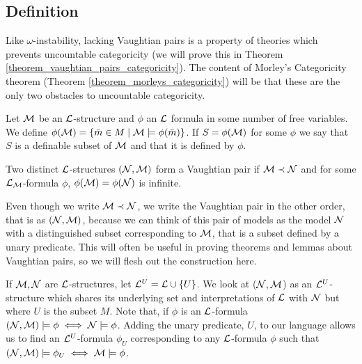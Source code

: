 \subsection{Definition}
Like \(\omega\)-instability, lacking Vaughtian pairs is a property of theories which prevents uncountable categoricity (we will prove this in Theorem \ref{theorem_vaughtian_pairs_categoricity}).
The content of Morley's Categoricity theorem (Theorem \ref{theorem_morleys_categoricity}) will be that these are the only two obstacles to uncountable categoricity. 

\begin{definition}\label{definition_definable_subset}
Let \(\mathcal{M}\) be an \(\mathcal{L}\)-structure and \(\phi\) an \(\mathcal{L}\) formula in some number of free variables.
We define \(\phi(\mathcal{M}) = \{\bar{m} \in M \mid \mathcal{M} \models \phi(\bar{m})\}\).
If \(S = \phi(\mathcal{M})\) for some \(\phi\) we say that \(S\) is a definable subset of \(\mathcal{M}\) and that it is defined by \(\phi\).
\end{definition}

\begin{definition}\label{definition_vaughtian_pairs}
Two distinct \(\mathcal{L}\)-structures \((\mathcal{N}, \mathcal{M})\) form a Vaughtian pair if \(\mathcal{M} \prec \mathcal{N}\) and for some \(\mathcal{L}_{\mathcal{M}}\)-formula \(\phi\), \(\phi(\mathcal{M}) = \phi(\mathcal{N})\) is infinite. 
\end{definition}

Even though we write \(\mathcal{M} \prec \mathcal{N}\), we write the Vaughtian pair in the other order, that is as \((\mathcal{N}, \mathcal{M})\), because we can think of this pair of models as the model \(\mathcal{N}\) with a distinguished subset corresponding to \(\mathcal{M}\), that is a subset defined by a unary predicate.
This will often be useful in proving theorems and lemmas about Vaughtian pairs, so we will flesh out the construction here. 

If \(\mathcal{M}, \mathcal{N}\) are \(\mathcal{L}\)-structures, let  \(\mathcal{L}^U = \mathcal{L} \cup \{U\}\). 
We look at (\(\mathcal{N}, \mathcal{M}\)) as an \(\mathcal{L}^U\)-structure which shares its underlying set and interpretations of \(\mathcal{L}\) with \(\mathcal{N}\) but where \(U\) is the subset \(M\). 
Note that, if \(\phi\) is an \(\mathcal{L}\)-formula \((\mathcal{N}, \mathcal{M}) \models \phi \iff \mathcal{N} \models \phi\).
Adding the unary predicate, \(U\), to our language allows us to find an \(\mathcal{L}^U\)-formula \(\phi_U\) corresponding to any \(\mathcal{L}\)-formula \(\phi\) such that \((\mathcal{N}, \mathcal{M}) \models \phi_U \iff \mathcal{M} \models \phi\).

